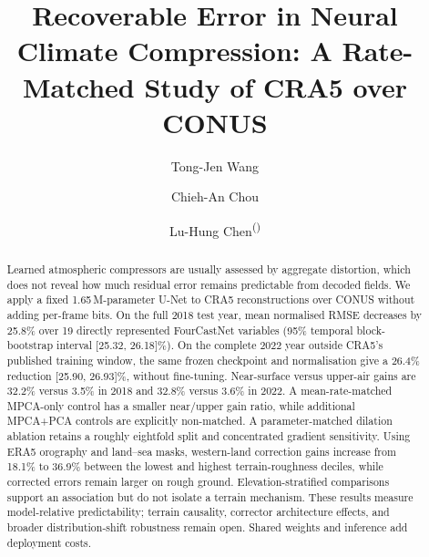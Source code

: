 \documentclass[a4paper,runningheads]{llncs}
\begin{document}
\title{Recoverable Error in Neural Climate Compression:
       A Rate-Matched Study of CRA5 over CONUS}

\author{Tong-Jen Wang \and
        Chieh-An Chou \and
        Lu-Hung Chen\textsuperscript{(\Letter)}}

\maketitle

\begin{abstract}
Learned atmospheric compressors are usually assessed by aggregate distortion,
which does not reveal how much residual error remains predictable from decoded
fields. We apply a fixed 1.65\,M-parameter U-Net to CRA5 reconstructions over
CONUS without adding per-frame bits. On the full 2018 test year, mean normalised
RMSE decreases by 25.8\% over 19 directly represented FourCastNet variables
(95\% temporal block-bootstrap interval [25.32, 26.18]\%). On the complete
2022 year outside CRA5's published training window, the same frozen checkpoint
and normalisation give a 26.4\% reduction [25.90, 26.93]\%, without fine-tuning.
Near-surface versus upper-air gains are 32.2\% versus 3.5\% in 2018 and 32.8\%
versus 3.6\% in 2022. A mean-rate-matched MPCA-only control has a smaller
near/upper gain ratio, while additional MPCA+PCA controls are explicitly
non-matched. A parameter-matched dilation ablation retains a roughly eightfold split
and concentrated gradient sensitivity. Using ERA5 orography and land--sea masks, western-land correction gains
increase from 18.1\% to 36.9\% between the lowest and highest terrain-roughness
deciles, while corrected errors remain larger on rough ground. Elevation-stratified
comparisons support an association but do not isolate a terrain mechanism. These results measure model-relative predictability;
terrain causality, corrector architecture effects, and broader distribution-shift
robustness remain open. Shared weights and inference add deployment costs.
\end{abstract}
\end{document}
